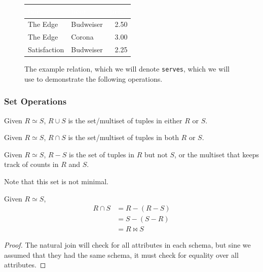 \documentclass{article}
\begin{document}
      \begin{figure}[H]
        \centering
        \begin{tabular}{|l|l|r|}
        \hline
        \rowcolor[HTML]{E26B0A} 
        \textcolor{white}{\textbf{bar}} & \textcolor{white}{\textbf{beer}} & \textcolor{white}{\textbf{price}} \\ \hline
        \rowcolor[HTML]{FBCEB1}
        The Edge & Budweiser & 2.50 \\ \hline
        \rowcolor[HTML]{FBCEB1}
        The Edge & Corona & 3.00 \\ \hline
        \rowcolor[HTML]{FBCEB1}
        Satisfaction & Budweiser & 2.25 \\ \hline
        \end{tabular}
        \caption{The example relation, which we will denote \texttt{serves}, which we will use to demonstrate the following operations.} 
        \label{fig:serves}
      \end{figure} 

    \subsubsection{Set Operations}

      \begin{definition}[Union]
        Given $R \simeq S$, $R \cup S$ is the set/multiset of tuples in either $R$ or $S$. 
      \end{definition}

      \begin{definition}[Intersection]
        Given $R \simeq S$, $R \cap S$ is the set/multiset of tuples in both $R$ or $S$. 
      \end{definition}

      \begin{definition}[Difference]
        Given $R \simeq S$, $R - S$ is the set of tuples in $R$ but not $S$, or the multiset that keeps track of counts in $R$ and $S$. 
      \end{definition}

      Note that this set is not minimal. 

      \begin{lemma} 
        Given $R \simeq S$, 
        \begin{align}
          R \cap S  & = R - (R - S) \\ 
                    & = S - (S - R) \\ 
                    & = R \bowtie S
        \end{align}
      \end{lemma}
      \begin{proof}
        The natural join will check for all attributes in each schema, but sine we assumed that they had the same schema, it must check for equality over all attributes.
      \end{proof}
\end{document}
